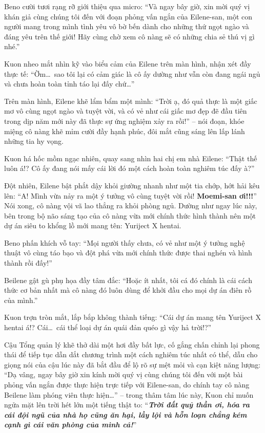 \documentclass[../main.tex]{subfiles}
\begin{document}
\chrint


Beno cười tươi rạng rỡ giới thiệu qua micro: ``Và ngay bây giờ, xin mời quý vị khán giả cùng chúng tôi đến với đoạn phỏng vấn ngắn của Eilene-san, một con người mang trong mình tình yêu vô bờ bến dành cho những thứ ngọt ngào và đáng yêu trên thế giới! Hãy cùng chờ xem cô nàng sẽ có những chia sẻ thú vị gì nhé.''

Kuon nheo mắt nhìn kỹ vào biểu cảm của Eilene trên màn hình, nhận xét đầy thực tế: ``Ờm\dots\ sao tôi lại có cảm giác là cô ấy dường như vẫn còn đang ngái ngủ và chưa hoàn toàn tỉnh táo lại đấy chứ\dots''

Trên màn hình, Eilene khẽ lẩm bẩm một mình: ``Trời ạ, đó quả thực là một giấc mơ vô cùng ngọt ngào và tuyệt vời, và có vẻ như cái giấc mơ đẹp đẽ đầu tiên trong dịp năm mới này đã thực sự ứng nghiệm xảy ra rồi!'' – nói đoạn, khóe miệng cô nàng khẽ mỉm cười đầy hạnh phúc, đôi mắt cũng sáng lên lấp lánh những tia hy vọng.

Kuon há hốc mồm ngạc nhiên, quay sang nhìn hai chị em nhà Eilene: ``Thật thế luôn á!? Cô ấy đang nói mấy cái lời đó một cách hoàn toàn nghiêm túc đấy à?''

Đột nhiên, Eilene bật phắt dậy khỏi giường nhanh như một tia chớp, hớt hải kêu lên: ``A! Mình vừa nảy ra một ý tưởng vô cùng tuyệt vời rồi! \textbf{Moemi-san ơi!!!}'' Nói xong, cô nàng vội vã lao thẳng ra khỏi phòng ngủ. Dường như ngay lúc này, bên trong bộ não sáng tạo của cô nàng vừa mới chính thức hình thành nên một dự án siêu to khổng lồ mới mang tên: Yuriject X hentai.


Beno phấn khích vỗ tay: ``Mọi người thấy chưa, có vẻ như một ý tưởng nghệ thuật vô cùng táo bạo và đột phá vừa mới chính thức được thai nghén và hình thành rồi đấy!''

Beilene gật gù phụ họa đầy tâm đắc: ``Hoặc ít nhất, tôi cá đó chính là cái cách thức cơ bản nhất mà cô nàng đó luôn dùng để khởi đầu cho mọi dự án điên rồ của mình.''

Kuon trợn tròn mắt, lắp bắp không thành tiếng: ``Cái dự án mang tên Yuriject X hentai á!? Cái\dots\ cái thể loại dự án quái đản quéo gì vậy hả trời!?''

Cậu Tổng quản lý khẽ thở dài một hơi đầy bất lực, cố gắng chấn chỉnh lại phong thái để tiếp tục dẫn dắt chương trình một cách nghiêm túc nhất có thể, dẫu cho giọng nói của cậu lúc này đã bắt đầu để lộ rõ sự mệt mỏi và cạn kiệt năng lượng: ``Dạ vâng, ngay bây giờ xin kính mời quý vị cùng chúng tôi đến với một bài phỏng vấn ngắn được thực hiện trực tiếp với Eilene-san, do chính tay cô nàng Beilene làm phóng viên thực hiện\dots'' – trong thâm tâm lúc này, Kuon chỉ muốn ngửa mặt lên trời hét lớn một tiếng thật to: ``\textbf{\textit{Trời đất quỷ thần ơi, hóa ra cái đội ngũ của nhà họ cũng ăn hại, lầy lội và hỗn loạn chẳng kém cạnh gì cái văn phòng của mình cả!}}''
\end{document}
